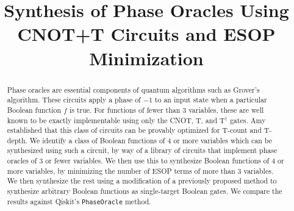 \documentclass[conference]{IEEEtran}
\begin{document}
\title{Synthesis of Phase Oracles Using CNOT+T Circuits and ESOP Minimization}

\author{
}

\maketitle

\begin{abstract}
Phase oracles are essential components of quantum algorithms such as Grover's algorithm. These circuits apply a phase of $-1$ to an input state when a particular Boolean function $f$ is true. For functions of fewer than 3 variables, these are well known to be exactly implementable using only the CNOT, T, and T$^\dagger$ gates. Amy~\cite{amy2018} established that this class of circuits can be provably optimized for T-count and T-depth. We identify a class of Boolean functions of 4 or more variables which can be synthesized using such a circuit, by way of a library of circuits that implement phase oracles of 3 or fewer variables. We then use this to synthesize Boolean functions of 4 or more variables, by minimizing the number of ESOP terms of more than 3 variables. We then synthesize the rest using a modification of a previously proposed method to synthesize arbitrary Boolean functions as single-target Boolean gates. We compare the results against Qiskit's \texttt{PhaseOracle} method.
\end{abstract}










\end{document}

